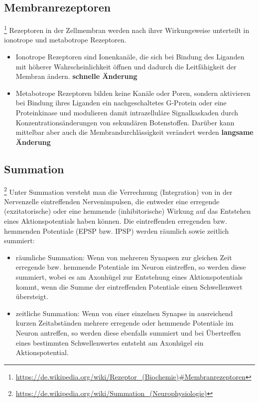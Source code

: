 \subsection{Membranrezeptoren}\footnote{\url{https://de.wikipedia.org/wiki/Rezeptor_(Biochemie)\#Membranrezeptoren}} 
Rezeptoren in der Zellmembran werden nach ihrer Wirkungsweise unterteilt in ionotrope und metabotrope Rezeptoren.
\begin{itemize}
	\item Ionotrope Rezeptoren sind Ionenkanäle, die sich bei Bindung des Liganden mit höherer Wahrscheinlichkeit öffnen und dadurch die Leitfähigkeit der Membran ändern. \textbf{schnelle Änderung}
	\item Metabotrope Rezeptoren bilden keine Kanäle oder Poren, sondern aktivieren bei Bindung ihres Liganden ein nachgeschaltetes G-Protein oder eine Proteinkinase und modulieren damit intrazelluläre Signalkaskaden durch Konzentrationsänderungen von sekundären Botenstoffen. Darüber kann mittelbar aber auch die Membrandurchlässigkeit verändert werden \textbf{langsame Änderung}
\end{itemize}

\subsection{Summation}\footnote{\url{https://de.wikipedia.org/wiki/Summation_(Neurophysiologie)}} 
Unter Summation versteht man die Verrechnung (Integration) von in der Nervenzelle eintreffenden Nervenimpulsen, die entweder eine erregende (exzitatorische) oder eine hemmende (inhibitorische) Wirkung auf das Entstehen eines Aktionspotentials haben können. Die eintreffenden erregenden bzw. hemmenden Potentiale (EPSP bzw. IPSP) werden räumlich sowie zeitlich summiert:
\begin{itemize}
    \item räumliche Summation: Wenn von mehreren Synapsen zur gleichen Zeit erregende bzw. hemmende Potentiale im Neuron eintreffen, so werden diese summiert, wobei es am Axonhügel zur Entstehung eines Aktionspotentials kommt, wenn die Summe der eintreffenden Potentiale einen Schwellenwert übersteigt.
    \item zeitliche Summation: Wenn von einer einzelnen Synapse in ausreichend kurzen Zeitabständen mehrere erregende oder hemmende Potentiale im Neuron antreffen, so werden diese ebenfalls summiert und bei Übertreffen eines bestimmten Schwellenwertes entsteht am Axonhügel ein Aktionspotential.
\end{itemize}

